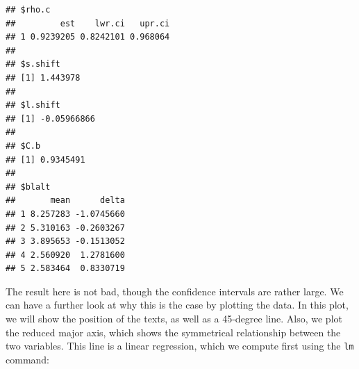 \documentclass[
]{book}
\newenvironment{Shaded}{\begin{snugshade}}{\end{snugshade}}
\newcommand{\AttributeTok}[1]{\textcolor[rgb]{0.77,0.63,0.00}{#1}}
\newcommand{\ConstantTok}[1]{\textcolor[rgb]{0.00,0.00,0.00}{#1}}
\newcommand{\DecValTok}[1]{\textcolor[rgb]{0.00,0.00,0.81}{#1}}
\newcommand{\FloatTok}[1]{\textcolor[rgb]{0.00,0.00,0.81}{#1}}
\newcommand{\FunctionTok}[1]{\textcolor[rgb]{0.00,0.00,0.00}{#1}}
\newcommand{\NormalTok}[1]{#1}
\newcommand{\OtherTok}[1]{\textcolor[rgb]{0.56,0.35,0.01}{#1}}
\newcommand{\SpecialCharTok}[1]{\textcolor[rgb]{0.00,0.00,0.00}{#1}}
\newcommand{\StringTok}[1]{\textcolor[rgb]{0.31,0.60,0.02}{#1}}
\begin{document}
\begin{Shaded}
\end{Shaded}

\begin{verbatim}
## $rho.c
##         est    lwr.ci   upr.ci
## 1 0.9239205 0.8242101 0.968064
## 
## $s.shift
## [1] 1.443978
## 
## $l.shift
## [1] -0.05966866
## 
## $C.b
## [1] 0.9345491
## 
## $blalt
##       mean      delta
## 1 8.257283 -1.0745660
## 2 5.310163 -0.2603267
## 3 3.895653 -0.1513052
## 4 2.560920  1.2781600
## 5 2.583464  0.8330719
\end{verbatim}

The result here is not bad, though the confidence intervals are rather large. We can have a further look at why this is the case by plotting the data. In this plot, we will show the position of the texts, as well as a 45-degree line. Also, we plot the reduced major axis, which shows the symmetrical relationship between the two variables. This line is a linear regression, which we compute first using the \texttt{lm} command:
\end{document}
